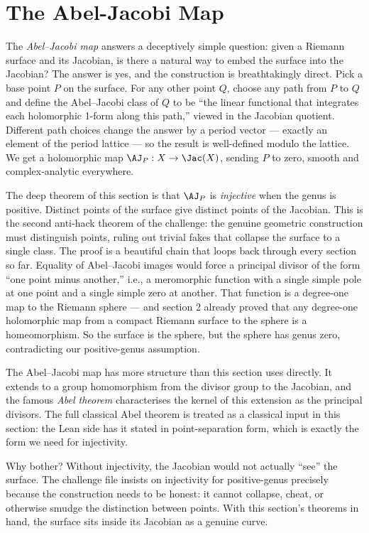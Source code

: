 \section{The Abel-Jacobi Map}
\label{sec:abel-jacobi}

\begin{layman}
The \emph{Abel--Jacobi map} answers a deceptively simple question:
given a Riemann surface and its Jacobian, is there a natural way to
embed the surface into the Jacobian? The answer is yes, and the
construction is breathtakingly direct. Pick a base point \(P\) on
the surface. For any other point \(Q\), choose any path from \(P\)
to \(Q\) and define the Abel--Jacobi class of \(Q\) to be ``the
linear functional that integrates each holomorphic 1-form along
this path,'' viewed in the Jacobian quotient. Different path
choices change the answer by a period vector — exactly an element
of the period lattice — so the result is well-defined modulo the
lattice. We get a holomorphic map
\(\AJ_P : X \to \Jac(X)\),
sending \(P\) to zero, smooth and complex-analytic everywhere.

The deep theorem of this section is that \(\AJ_P\) is
\emph{injective} when the genus is positive. Distinct points of the
surface give distinct points of the Jacobian. This is the second
anti-hack theorem of the challenge: the genuine geometric
construction must distinguish points, ruling out trivial fakes that
collapse the surface to a single class. The proof is a beautiful
chain that loops back through every section so far. Equality of
Abel--Jacobi images would force a principal divisor of the form
``one point minus another,'' i.e., a meromorphic function with a
single simple pole at one point and a single simple zero at another.
That function is a degree-one map to the Riemann sphere — and
section 2 already proved that any degree-one holomorphic map from a
compact Riemann surface to the sphere is a homeomorphism. So the
surface is the sphere, but the sphere has genus zero, contradicting
our positive-genus assumption.

The Abel--Jacobi map has more structure than this section uses
directly. It extends to a group homomorphism from the divisor group
to the Jacobian, and the famous \emph{Abel theorem} characterises
the kernel of this extension as the principal divisors. The full
classical Abel theorem is treated as a classical input in this
section: the Lean side has it stated in point-separation form,
which is exactly the form we need for injectivity.

Why bother? Without injectivity, the Jacobian would not actually
``see'' the surface. The challenge file insists on injectivity for
positive-genus precisely because the construction needs to be
honest: it cannot collapse, cheat, or otherwise smudge the
distinction between points. With this section's theorems in hand,
the surface sits inside its Jacobian as a genuine curve.
\end{layman}

